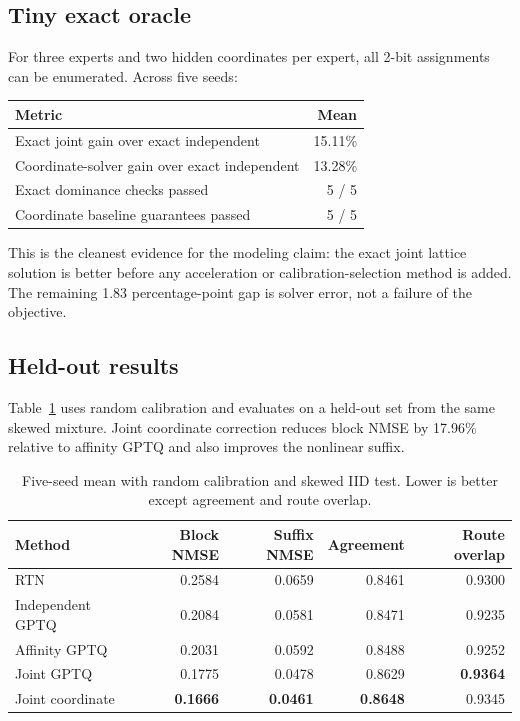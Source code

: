 \documentclass[11pt]{article}
\theoremstyle{plain}
\theoremstyle{definition}
\theoremstyle{remark}
\begin{document}
\subsection{Tiny exact oracle}

For three experts and two hidden coordinates per expert, all 2-bit assignments can be enumerated.  Across five seeds:

\begin{center}
\begin{tabular}{lr}
\toprule
Metric & Mean \\
\midrule
Exact joint gain over exact independent & 15.11\% \\
Coordinate-solver gain over exact independent & 13.28\% \\
Exact dominance checks passed & 5 / 5 \\
Coordinate baseline guarantees passed & 5 / 5 \\
\bottomrule
\end{tabular}
\end{center}

This is the cleanest evidence for the modeling claim: the exact joint lattice solution is better before any acceleration or calibration-selection method is added.  The remaining 1.83 percentage-point gap is solver error, not a failure of the objective.

\subsection{Held-out results}

Table~\ref{tab:iid} uses random calibration and evaluates on a held-out set from the same skewed mixture.  Joint coordinate correction reduces block NMSE by 17.96\% relative to affinity GPTQ and also improves the nonlinear suffix.

\begin{table}[h]
\centering
\small
\caption{Five-seed mean with random calibration and skewed IID test. Lower is better except agreement and route overlap.}\label{tab:iid}
\begin{tabular}{lrrrr}
\toprule
Method & Block NMSE & Suffix NMSE & Agreement & Route overlap \\
\midrule
RTN & 0.2584 & 0.0659 & 0.8461 & 0.9300 \\
Independent GPTQ & 0.2084 & 0.0581 & 0.8471 & 0.9235 \\
Affinity GPTQ & 0.2031 & 0.0592 & 0.8488 & 0.9252 \\
Joint GPTQ & 0.1775 & 0.0478 & 0.8629 & \textbf{0.9364} \\
Joint coordinate & \textbf{0.1666} & \textbf{0.0461} & \textbf{0.8648} & 0.9345 \\
\bottomrule
\end{tabular}
\end{table}
\end{document}
